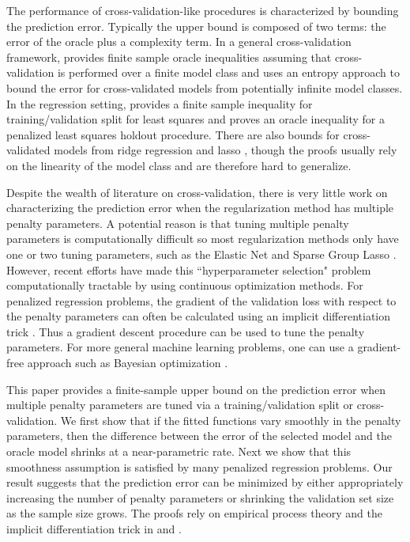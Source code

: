 \documentclass[12pt]{article}
\begin{document}
The performance of cross-validation-like procedures is characterized by bounding the prediction error. Typically the upper bound is composed of two terms: the error of the oracle plus a complexity term. In a general cross-validation framework, \citet{van2003unified, van2004asymptotic} provides finite sample oracle inequalities assuming that cross-validation is performed over a finite model class and \citet{lecue2012oracle} uses an entropy approach to bound the error for cross-validated models from potentially infinite model classes. In the regression setting, \citet{gyorfi2006distribution} provides a finite sample inequality for training/validation split for least squares and \citet{wegkamp2003model} proves an oracle inequality for a penalized least squares holdout procedure. There are also bounds for cross-validated models from ridge regression and lasso \citep{golub1979generalized, chetverikov2016cross, chatterjee2015prediction}, though the proofs usually rely on the linearity of the model class and are therefore hard to generalize.

Despite the wealth of literature on cross-validation, there is very little work on characterizing the prediction error when the regularization method has multiple penalty parameters. A potential reason is that tuning multiple penalty parameters is computationally difficult so most regularization methods only have one or two tuning parameters, such as the Elastic Net and Sparse Group Lasso \citep{zou2003regression, simon2013sparse}. However, recent efforts have made this ``hyperparameter selection" problem computationally tractable by using continuous optimization methods. For penalized regression problems, the gradient of the validation loss with respect to the penalty parameters can often be calculated using an implicit differentiation trick \citep{bengio2000gradient, foo2008efficient}. Thus a gradient descent procedure can be used to tune the penalty parameters. For more general machine learning problems, one can use a gradient-free approach such as Bayesian optimization \citet{snoek2012practical}.

This paper provides a finite-sample upper bound on the prediction error when multiple penalty parameters are tuned via a training/validation split or cross-validation. We first show that if the fitted functions vary smoothly in the penalty parameters, then the difference between the error of the selected model and the oracle model shrinks at a near-parametric rate. Next we show that this smoothness assumption is satisfied by many penalized regression problems. Our result suggests that the prediction error can be minimized by either appropriately increasing the number of penalty parameters or shrinking the validation set size as the sample size grows. The proofs rely on empirical process theory and the implicit differentiation trick in \citet{bengio2000gradient} and \citet{foo2008efficient}.
\end{document}

